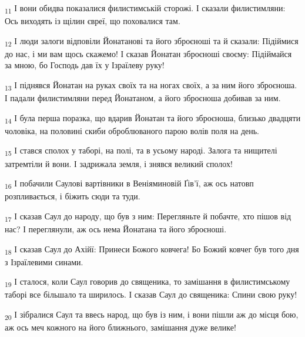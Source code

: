 \begin{tcolorbox}
\textsubscript{11} І вони обидва показалися филистимській сторожі. І сказали филистимляни: Ось виходять із щілин євреї, що поховалися там.
\end{tcolorbox}
\begin{tcolorbox}
\textsubscript{12} І люди залоги відповіли Йонатанові та його зброєноші та й сказали: Підіймися до нас, і ми вам щось скажемо! І сказав Йонатан зброєноші своєму: Підіймайся за мною, бо Господь дав їх у Ізраїлеву руку!
\end{tcolorbox}
\begin{tcolorbox}
\textsubscript{13} І піднявся Йонатан на руках своїх та на ногах своїх, а за ним його зброєноша. І падали филистимляни перед Йонатаном, а його зброєноша добивав за ним.
\end{tcolorbox}
\begin{tcolorbox}
\textsubscript{14} І була перша поразка, що вдарив Йонатан та його зброєноша, близько двадцяти чоловіка, на половині скиби оброблюваного парою волів поля на день.
\end{tcolorbox}
\begin{tcolorbox}
\textsubscript{15} І стався сполох у таборі, на полі, та в усьому народі. Залога та нищителі затремтіли й вони. І задрижала земля, і знявся великий сполох!
\end{tcolorbox}
\begin{tcolorbox}
\textsubscript{16} І побачили Саулові вартівники в Веніяминовій Ґів'ї, аж ось натовп розпливається, і біжить сюди та туди.
\end{tcolorbox}
\begin{tcolorbox}
\textsubscript{17} І сказав Саул до народу, що був з ним: Перегляньте й побачте, хто пішов від нас? І переглянули, аж ось нема Йонатана та його зброєноші.
\end{tcolorbox}
\begin{tcolorbox}
\textsubscript{18} І сказав Саул до Ахійї: Принеси Божого ковчега! Бо Божий ковчег був того дня з Ізраїлевими синами.
\end{tcolorbox}
\begin{tcolorbox}
\textsubscript{19} І сталося, коли Саул говорив до священика, то замішання в филистимському таборі все більшало та ширилось. І сказав Саул до священика: Спини свою руку!
\end{tcolorbox}
\begin{tcolorbox}
\textsubscript{20} І зібралися Саул та ввесь народ, що був із ним, і вони пішли аж до місця бою, аж ось меч кожного на його ближнього, замішання дуже велике!
\end{tcolorbox}
